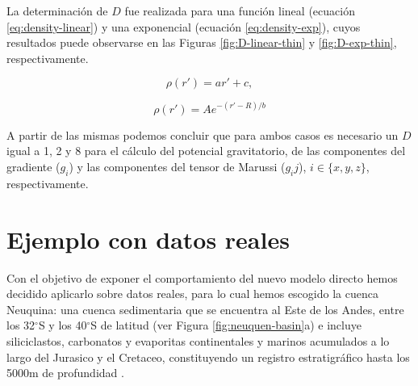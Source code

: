 \documentclass[a4paper,10pt]{article}
\begin{document}
La determinación de $D$ fue realizada para una función lineal (ecuación \ref{eq:density-linear}) y una exponencial (ecuación \ref{eq:density-exp}), cuyos resultados puede observarse en las Figuras \ref{fig:D-linear-thin} y \ref{fig:D-exp-thin}, respectivamente.

\begin{equation}
    \rho(r') = ar' + c,
    \label{eq:density-linear}
\end{equation}

\begin{equation}
    \rho(r') = A e^{-(r' - R)/b}
\label{eq:density-exp}
\end{equation}


A partir de las mismas podemos concluir que para ambos casos es necesario un $D$ igual a 1, 2 y 8 para el cálculo del potencial gravitatorio, de las componentes del gradiente ($g_i$) y las componentes del tensor de Marussi ($g_ij$), $i \in \{ x, y, z\}$, respectivamente.




\section{Ejemplo con datos reales}

Con el objetivo de exponer el comportamiento del nuevo modelo directo hemos decidido aplicarlo sobre datos reales, para lo cual hemos escogido la cuenca Neuquina: una cuenca sedimentaria que se encuentra al Este de los Andes, entre los 32$^\circ$S y los 40$^\circ$S de latitud (ver Figura \ref{fig:neuquen-basin}a) e incluye siliciclastos, carbonatos y evaporitas continentales y marinos acumulados a lo largo del Jurasico y el Cretaceo, constituyendo un registro estratigráfico hasta los 5000m de profundidad \citep{Howell2005}.
\end{document}
